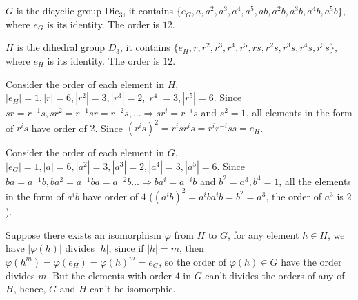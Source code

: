 \documentclass[12pt]{article}
\begin{document}
\section{}
$G$ is the dicyclic group $\mathrm{Dic}_3$, it contains $\{e_G,a,a^2,a^3,a^4,a^5,ab,a^2b,a^3b,a^4b,a^5b\}$, where $e_G$ is its identity. The order is $12$.

$H$ is the dihedral group $D_3$, it contains $\{e_H, r,r^2,r^3,r^4,r^5,rs,r^2s,r^3s,r^4s,r^5s\}$, where $e_H$ is its identity. The order is $12$.

Consider the order of each element in $H$, $|e_H|=1,|r|=6,|r^2|=3,|r^3|=2,|r^4|=3,|r^5|=6$. Since $sr=r^{-1}s, sr^2=r^{-1}sr=r^{-2}s,\dots\Rightarrow sr^{i}=r^{-i}s$ and $s^2=1$, all elements in the form of $r^is$ have order of $2$. Since $(r^is)^2=r^isr^is=r^ir^{-i}ss=e_H$.

Consider the order of each element in $G$, $|e_G|=1,|a|=6,|a^2|=3,|a^3|=2,|a^4|=3,|a^5|=6$. Since $ba=a^{-1}b, ba^2=a^{-1}ba=a^{-2}b\dots\Rightarrow ba^{i}=a^{-i}b$ and $b^2=a^3,b^4=1$, all the elements in the form of $a^ib$ have order of $4$ ($(a^ib)^2=a^iba^ib=b^2=a^3$, the order of $a^3$ is $2$).

Suppose there exists an isomorphism $\varphi$ from $H$ to $G$, for any element $h\in H$, we have $|\varphi(h)|$ divides $|h|$, since if $|h|=m$, then $\varphi(h^m)=\varphi(e_H)=\varphi(h)^m=e_G$, so the order of $\varphi(h)\in G$ have the order divides $m$. But the elements with order $4$ in $G$ can't divides the orders of any of $H$, hence, $G$ and $H$ can't be isomorphic.

\section{}
\subsection{}
\subsection{}
\subsection{}


\section{}
\subsection{}
\subsection{}
\subsection{}
\end{document}
